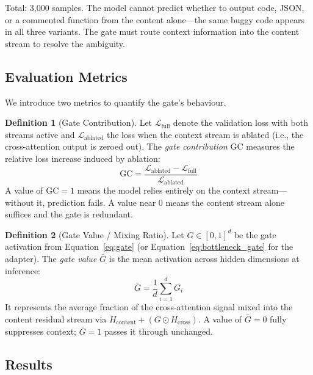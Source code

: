 \documentclass[11pt,a4paper]{article}
\theoremstyle{definition}
\newtheorem{definition}{Definition}[section]
\begin{document}
Total: 3,000 samples. The model cannot predict whether to output code, JSON, or a commented function from the content alone---the same buggy code appears in all three variants. The gate must route context information into the content stream to resolve the ambiguity.

\subsection{Evaluation Metrics}

We introduce two metrics to quantify the gate's behaviour.

\begin{definition}[Gate Contribution]\label{def:gate_contribution}
Let $\mathcal{L}_{\text{full}}$ denote the validation loss with both streams active and $\mathcal{L}_{\text{ablated}}$ the loss when the context stream is ablated (i.e., the cross-attention output is zeroed out). The \emph{gate contribution} $\text{GC}$ measures the relative loss increase induced by ablation:
\begin{equation}
  \text{GC} = \frac{\mathcal{L}_{\text{ablated}} - \mathcal{L}_{\text{full}}}{\mathcal{L}_{\text{ablated}}}
\end{equation}
A value of $\text{GC} = 1$ means the model relies entirely on the context stream---without it, prediction fails. A value near $0$ means the content stream alone suffices and the gate is redundant.
\end{definition}

\begin{definition}[Gate Value / Mixing Ratio]\label{def:gate_value}
Let $G \in [0,1]^{d}$ be the gate activation from Equation~\eqref{eq:gate} (or Equation~\eqref{eq:bottleneck_gate} for the adapter). The \emph{gate value} $\bar{G}$ is the mean activation across hidden dimensions at inference:
\begin{equation}
  \bar{G} = \frac{1}{d}\sum_{i=1}^{d} G_i
\end{equation}
It represents the average fraction of the cross-attention signal mixed into the content residual stream via $H_{\text{content}} + (G \odot H_{\text{cross}})$. A value of $\bar{G} = 0$ fully suppresses context; $\bar{G} = 1$ passes it through unchanged.
\end{definition}

\subsection{Results}
\end{document}
